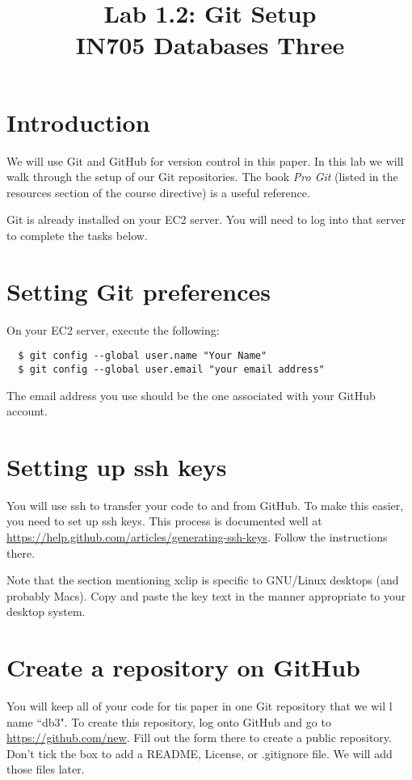 \documentclass{article}
\begin{document}
\title{Lab 1.2: Git Setup\\ IN705 Databases Three}
\date{}
\maketitle

\section*{Introduction}
We will use Git and GitHub for version control in this paper.  In this lab we will walk through the setup of our Git repositories.  The book \emph{Pro Git} (listed in the resources section of the course directive) is a useful reference.

Git is already installed on your EC2 server.  You will need to log into that server to complete the tasks below.

\section{Setting Git preferences}
On your EC2 server, execute the following:

\begin{verbatim}
  $ git config --global user.name "Your Name"
  $ git config --global user.email "your email address"
\end{verbatim}

The email address you use should be the one associated with your GitHub account.


\section{Setting up ssh keys}
You will use ssh to transfer your code to and from GitHub.  To make this easier, you need to set up ssh keys.  This process is documented well at \url{https://help.github.com/articles/generating-ssh-keys}.  Follow the instructions there.

Note that the section mentioning xclip is specific to GNU/Linux desktops (and probably Macs). Copy and paste the key text in the manner appropriate to your desktop system.   

\section{Create a repository on GitHub}
You will keep all of your code for tis paper in one Git repository that we wil l name ``db3".  To create this repository, log onto GitHub and go to \url{https://github.com/new}.  Fill out the form there to create a public repository.  Don't tick the box to add a README, License, or .gitignore file.  We will add those files later.
\end{document}
